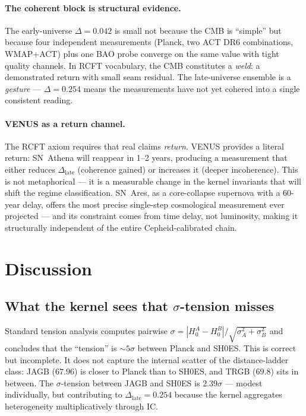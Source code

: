 \documentclass[
  aps,
  prd,
  twocolumn,
  superscriptaddress,
  nofootinbib,
  floatfix
]{revtex4-2}
\newcommand{\IC}{\mathrm{IC}}
\newcommand{\hetgap}{\Delta}
\begin{document}
\paragraph{The coherent block is structural evidence.}
The early-universe $\hetgap = 0.042$ is small not because
the CMB is ``simple'' but because four independent measurements
(Planck, two ACT DR6 combinations, WMAP+ACT) plus one BAO probe
converge on the same value with tight quality channels.
In RCFT vocabulary, the CMB constitutes a \emph{weld}:
a demonstrated return with small seam residual.
The late-universe ensemble is a \emph{gesture} ---
$\hetgap = 0.254$ means the measurements have not yet cohered
into a single consistent reading.

\paragraph{VENUS as a return channel.}
The RCFT axiom requires that real claims \emph{return}.
VENUS provides a literal return: SN~Athena will reappear
in 1--2 years, producing a measurement that either reduces
$\hetgap_{\mathrm{late}}$ (coherence gained) or increases it
(deeper incoherence). This is not metaphorical --- it is a
measurable change in the kernel invariants that will shift
the regime classification.
SN~Ares, as a core-collapse supernova with a 60-year delay,
offers the most precise single-step cosmological measurement
ever projected --- and its constraint comes from time delay,
not luminosity, making it structurally independent of the
entire Cepheid-calibrated chain.

\section{Discussion}\label{sec:discussion}

\subsection{What the kernel sees that $\sigma$-tension misses}

Standard tension analysis computes pairwise
$\sigma = |H_0^A - H_0^B|/\sqrt{\sigma_A^2 + \sigma_B^2}$
and concludes that the ``tension'' is
$\sim\!5\sigma$ between Planck and SH0ES.
This is correct but incomplete.
It does not capture the internal scatter of the distance-ladder
class: JAGB ($67.96$) is closer to Planck than to SH0ES, and
TRGB ($69.8$) sits in between.
The $\sigma$-tension between JAGB and SH0ES is
$2.39\sigma$ --- modest individually, but contributing to
$\hetgap_{\mathrm{late}} = 0.254$ because the kernel
aggregates heterogeneity multiplicatively through $\IC$.
\end{document}
